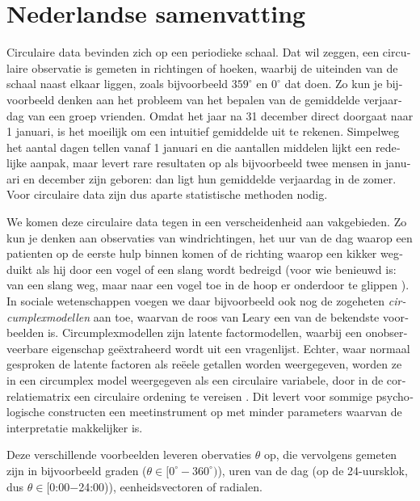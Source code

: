 \documentclass[12pt, a4paper]{book}\usepackage[]{graphicx}\usepackage{xcolor}
\begin{document}
\label{circbays}


\backmatter



\chapter{Nederlandse samenvatting}

\begin{otherlanguage}{dutch}

Circulaire data bevinden zich op een periodieke schaal. Dat wil zeggen, een circulaire observatie is gemeten in richtingen of hoeken, waarbij de uiteinden van de schaal naast elkaar liggen, zoals bijvoorbeeld $359^\circ$ en $0^\circ$ dat doen. Zo kun je bijvoorbeeld denken aan het probleem van het bepalen van de gemiddelde verjaardag van een groep vrienden. Omdat het jaar na 31 december direct doorgaat naar 1 januari, is het moeilijk om een intuitief gemiddelde uit te rekenen. Simpelweg het aantal dagen tellen vanaf 1 januari en die aantallen middelen lijkt een redelijke aanpak, maar levert rare resultaten op als bijvoorbeeld twee mensen in januari en december zijn geboren: dan ligt hun gemiddelde verjaardag in de zomer. Voor circulaire data zijn dus aparte statistische methoden nodig.

We komen deze circulaire data tegen in een verscheidenheid aan vakgebieden. Zo kun je denken aan observaties van windrichtingen,  het uur van de dag waarop een patienten op de eerste hulp binnen komen of de richting waarop een kikker wegduikt als hij door een vogel of een slang wordt bedreigd (voor wie benieuwd is: van een slang weg, maar naar een vogel toe in de hoop er onderdoor te glippen \citep{bulbert2015danger}). In sociale wetenschappen voegen we daar bijvoorbeeld ook nog de zogeheten \textit{circumplexmodellen} aan toe, waarvan de roos van Leary \citep{Leary1957} een van de bekendste voorbeelden is. Circumplexmodellen zijn latente factormodellen, waarbij een onobserveerbare eigenschap ge\"extraheerd wordt uit een vragenlijst. Echter, waar normaal gesproken de latente factoren als re\"eele getallen worden weergegeven, worden ze in een circumplex model weergegeven als een circulaire variabele, door in de correlatiematrix een circulaire ordening te vereisen \citep{browne1992circumplex}. Dit levert voor sommige psychologische constructen een meetinstrument op met minder parameters waarvan de interpretatie makkelijker is.

Deze verschillende voorbeelden leveren obervaties $\theta$ op, die vervolgens gemeten zijn in bijvoorbeeld graden ($\theta \in [0^\circ - 360^\circ)$), uren van de dag (op de 24-uursklok, dus $\theta \in [$0:00$ - $24:00)), eenheidsvectoren of radialen.


\end{otherlanguage}
\end{document}
